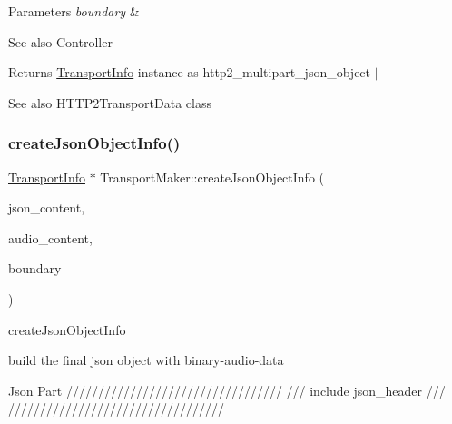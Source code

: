 \begin{DoxyParams}{Parameters}
{\em boundary} & \\
\hline
\end{DoxyParams}
\begin{DoxySeeAlso}{See also}
Controller 
\end{DoxySeeAlso}
\begin{DoxyReturn}{Returns}
\hyperlink{classAlexaEvent_1_1TransportInfo}{Transport\+Info} instance as http2\+\_\+multipart\+\_\+json\+\_\+object $\vert$ 
\end{DoxyReturn}
\begin{DoxySeeAlso}{See also}
H\+T\+T\+P2\+Transport\+Data class 
\end{DoxySeeAlso}
\mbox{\label{classAlexaEvent_1_1TransportMaker_a6c5d565390aa7b1be80859cd0cb5b7bb}} 
\subsubsection{\texorpdfstring{create\+Json\+Object\+Info()}{createJsonObjectInfo()}\hspace{0.1cm}{\footnotesize\ttfamily [2/2]}}
{\footnotesize\ttfamily \hyperlink{classAlexaEvent_1_1TransportInfo}{Transport\+Info} $\ast$ Transport\+Maker\+::create\+Json\+Object\+Info (\begin{DoxyParamCaption}\item[{\hyperlink{classAlexaEvent_1_1TransportInfo}{Transport\+Info} $\ast$}]{json\+\_\+content,  }\item[{\hyperlink{classAlexaEvent_1_1TransportInfo}{Transport\+Info} $\ast$}]{audio\+\_\+content,  }\item[{const char $\ast$}]{boundary }\end{DoxyParamCaption})}



create\+Json\+Object\+Info 

build the final json object with binary-\/audio-\/data


\begin{DoxyEnumerate}
\item Json Part ////////////////////////////////// /// include json\+\_\+header /// //////////////////////////////////
\end{DoxyEnumerate}


